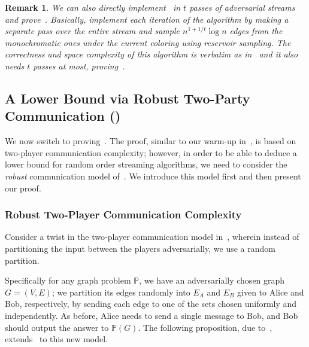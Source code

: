 \documentclass[11pt]{article}
\newtheorem{remark}[lemma]{Remark}
\theoremstyle{definition}
\begin{document}
\begin{remark}\label{rem:multi-pass}
	We can also directly implement~ in $t$ passes of adversarial streams and prove~. Basically, implement each iteration of the algorithm by making a separate pass
	over the entire stream and sample $n^{1+1/t}\log{n}$ edges from the monochromatic ones under the current coloring using reservoir sampling. The correctness and space complexity of this algorithm is verbatim as in~ 
	and it also needs $t$ passes at most, proving~. 
\end{remark}


\subsection{A Lower Bound via Robust Two-Party Communication ()}\label{sec:random-lower}

We now switch to proving~. The proof, similar to our warm-up in~, is based on two-player communication complexity; however, in order to be able to deduce a lower bound
for random order streaming algorithms, we need to consider the \emph{robust} communication model of~\cite{ChakrabartiCM08}. We introduce this model first and then present our proof. 

\subsubsection{Robust Two-Player Communication Complexity}\label{sec:robust}

Consider a twist in the two-player communication model in~, wherein instead of partitioning the input between the players adversarially, we use a random partition. 

Specifically for any graph problem $\mathbb{P}$, we have an adversarially chosen graph $G=(V,E)$; we partition its edges randomly into $E_A$ and $E_B$ given to Alice and Bob, respectively, by sending each edge to one of the sets chosen uniformly and independently. As before, Alice needs to send a single message to Bob, and Bob should output the answer to $\mathbb{P}(G)$. The following proposition, due to~\cite{ChakrabartiCM08}, 
extends~ to this new model. 
\end{document}
